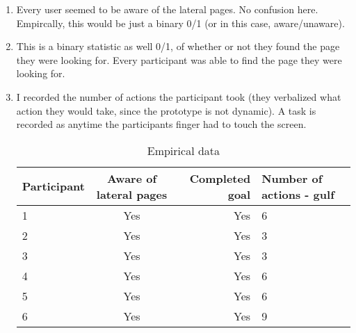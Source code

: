 \begin{enumerate}
\item
  Every user seemed to be aware of the lateral pages. No confusion here. Empircally, this would be just a binary 0/1 (or in this case, aware/unaware).
\item
  This is a binary statistic as well 0/1, of whether or not they found the page they were looking for. Every participant was able to find the page they were looking for.
\item
  I recorded the number of actions the participant took (they verbalized what action they would take, since the prototype is not dynamic). A task is recorded as anytime the participants finger had to touch the screen.

\begin{table}[H]
  \centering
  \caption{Empirical data}
  \label{table:1}
  \begin{tabular}{@{}lcrl@{}}
    \textbf{Participant} & \textbf{Aware of lateral pages} & \textbf{Completed goal} & \textbf{Number of actions - gulf}\\
    \midrule
    1 & Yes & Yes & 6 \\
    \midrule
    2 & Yes & Yes & 3 \\
    \midrule
    3 & Yes & Yes & 3 \\
    \midrule
    4 & Yes & Yes & 6 \\
    \midrule
    5 & Yes & Yes & 6 \\
    \midrule
    6 & Yes & Yes & 9 \\
  \end{tabular}
\end{table}

\end{enumerate}


